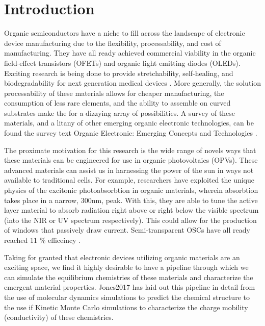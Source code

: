 \chapter{Introduction} 
Organic semiconductors have a niche to fill across the landscape of electronic
device manufacturing due to the flexibility, processability, and cost of manufacturing. They have all ready
achieved commercial viability in the organic field-effect transistors (OFETs) and organic light emitting
diodes (OLEDs).
Exciting research is being done to provide stretchability, self-healing, and biodegradability for 
next generation medical devices \cite{Brutting2006}.
More generally, the solution processability of these materials allows for
cheaper manufacturing, the consumption of less rare elements, and the ability to assemble on curved substrates make the for a dizzying array of possibilities. A survey of these materials, and a litany of
other emerging organic electronic technologies, can be found the survey text 
Organic Electronic: Emerging Concepts and Technologies
\cite{FabioCicoiraEditor2013}. 

The proximate motivation for this research is the wide range of novels ways that these materials can be
engineered for use in organic photovoltaics (OPVs). These advanced materials
can assist us in harnessing the power of the sun in ways not available to traditional cells. 
For example, researchers have exploited the unique physics of the excitonic photoabsorbtion in 
organic materials, wherein absorbtion takes place in a narrow, 300nm, peak.
With this, they are able to tune the active layer material to absorb radiation right above or right below the
visible spectrum (into the NIR or UV spectrum respectively). This 
could allow for the production of windows that passively draw current. Semi-transparent OSCs have all ready
reached 11 \% efficeincy \cite{Brabec2020}. 

Taking for granted that electronic devices utilizing organic materials are an exciting
space, we find it highly desirable to have a pipeline through which we can simulate the equilibrium
chemistries of these materials and characterize the emergent material properties. Jones2017 has laid out this
pipeline in detail from the use of molecular dynamics simulations to predict the chemical structure to the use
if Kinetic Monte Carlo simulations to characterize the charge mobility (conductivity) of these chemistries.

